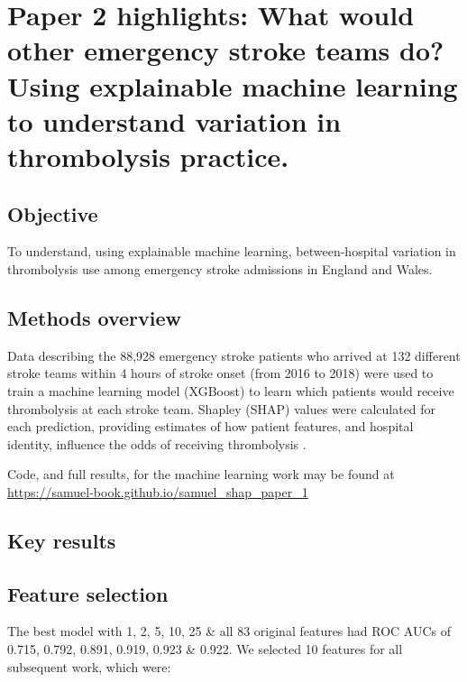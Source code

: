 \section{Paper 2 highlights: What would other emergency stroke teams do? Using explainable machine learning to understand variation in thrombolysis practice.\cite{pearn_what_2023}}\label{sec:paper_2}

\subsection{Objective}

To understand, using explainable machine learning, between-hospital variation in thrombolysis use among emergency stroke admissions in England and Wales.

\subsection{Methods overview}

Data describing the 88,928 emergency stroke patients who arrived at 132 different stroke teams within 4 hours of stroke onset (from 2016 to 2018) were used to train a machine learning model (XGBoost\cite{chen_xgboost_2016}) to learn which patients would receive thrombolysis at each stroke team. Shapley (SHAP) values were calculated for each prediction, providing estimates of how patient features, and hospital identity, influence the odds of receiving thrombolysis \cite{lundberg_unified_2017}.

Code, and full results, for the machine learning work may be found at 
 \url{https://samuel-book.github.io/samuel_shap_paper_1}

\subsection{Key results}

\subsection{Feature selection}

The best model with 1, 2, 5, 10, 25 \& all 83 original features had ROC AUCs of 0.715, 0.792, 0.891, 0.919, 0.923 \& 0.922. We selected 10 features for all subsequent work, which were:

